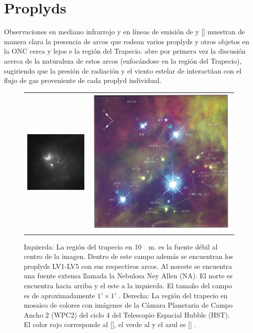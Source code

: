 \section{Proplyds}
Observaciones en mediano infrarrojo y en líneas de emisión de  y [] \citep{Robberto:2005, Bally:1998, Bally:2000} muestran de manera clara la presencia de arcos que rodean varios proplyds y otros objetos en la ONC cerca y lejos e la región del Trapecio. \citet{Hayward:1994} abre por primera vez la discusión acerca de la naturaleza de estos arcos (enfocándose en la región del Trapecio), sugiriendo que la presión de radiación y el viento estelar de \thC{} interactúan con el flujo de gas proveniente de cada proplyd individual.

\begin{figure}
  \centering
  \begin{tabular}{lr}    \includegraphics[width=0.5\linewidth]{./Figures/Orion_Robberto}&\includegraphics[width=0.5\linewidth]{./Figures/bally-trapezium}
  \end{tabular}
  \caption{Izquierda: La región del trapecio en \SI{10}{\mu m}. \thC{} es la fuente débil al centro de la imagen. Dentro de este campo además se encuentran los proplyds LV1-LV5 con sus respectivos arcos. Al noreste se encuentra una fuente extensa llamada la Nebulosa Ney Allen (NA). El norte es encuentra hacia arriba y el este a la izquierda. El tamaño del campo es de aproximadamente $1' \times 1'$ \citep{Robberto:2005}. Derecha: La región del trapecio en mosaico de colores con imágenes de la Cámara Planetaria de Campo Ancho 2 (WPC2) del ciclo 4 del Telescopio Espacial Hubble (HST). El color rojo corresponde al [], el verde al  y el azul es [] \citep{Bally:1998}.}
\end{figure}


